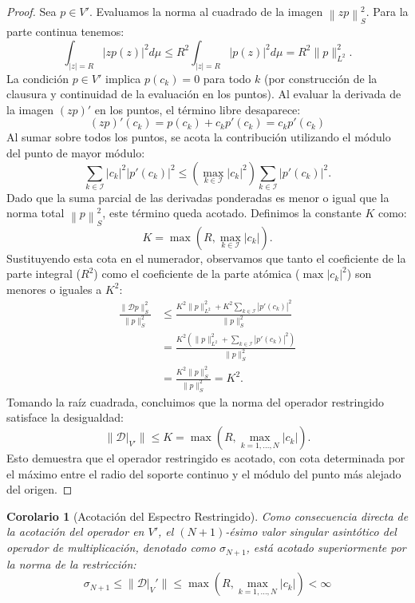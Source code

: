 \documentclass[12pt,a4paper]{article}
\newtheorem{corolario}{Corolario}
\theoremstyle{definition}
\theoremstyle{remark}
\newcommand{\norm}[1]{\left\| #1 \right\|_S}
\newcommand{\D}{\mathcal{D}}
\begin{document}
\begin{proof}
    Sea $p \in V'$. Evaluamos la norma al cuadrado de la imagen $\norm{zp}^2$. Para la parte continua tenemos:
    $$\int_{|z|=R} |z p(z)|^2 d\mu \le R^2 \int_{|z|=R} |p(z)|^2 d\mu = R^2 \|p\|_{L^2}^2.$$
    La condición $p \in V'$ implica $p(c_k)=0$ para todo $k$ (por construcción de la clausura y continuidad de la evaluación en los puntos). Al evaluar la derivada de la imagen $(zp)'$ en los puntos, el término libre desaparece:
    $$ (zp)'(c_k) = p(c_k) + c_k p'(c_k) = c_k p'(c_k) $$
    Al sumar sobre todos los puntos, se acota la contribución utilizando el módulo del punto de mayor módulo:
    $$ \sum_{k \in \mathcal{I}}  |c_k|^2 |p'(c_k)|^2 \le \left( \max_{k \in \mathcal{I}} |c_k|^2 \right) \sum_{k \in \mathcal{I}}  |p'(c_k)|^2. $$
    Dado que la suma parcial de las derivadas ponderadas es menor o igual que la norma total $\norm{p}^2$, este término queda acotado.
    Definimos la constante $K$ como:
    $$ K = \max \left( R, \max_{k \in \mathcal{I}} |c_k| \right). $$
    Sustituyendo esta cota en el numerador, observamos que tanto el coeficiente de la parte integral ($R^2$) como el coeficiente de la parte atómica ($\max |c_k|^2$) son menores o iguales a $K^2$:
    \begin{align*}
        \frac{\|\D p\|_S^2}{\|p\|_S^2} & \le \frac{K^2 \|p\|_{L^2}^2 + K^2 \sum_{k \in \mathcal{I}}  |p'(c_k)|^2}{\|p\|_{S}^2}          \\
                                       & = \frac{K^2 \left( \|p\|_{L^2}^2 + \sum_{k \in \mathcal{I}}  |p'(c_k)|^2 \right)}{\|p\|_{S}^2} \\
                                       & = \frac{K^2 \|p\|_S^2}{\|p\|_S^2} = K^2.
    \end{align*}
    Tomando la raíz cuadrada, concluimos que la norma del operador restringido satisface la desigualdad:
    $$\|\D|_{V'}\| \le K = \max \left( R, \max_{k=1,\dots,N} |c_k| \right).$$
    Esto demuestra que el operador restringido es acotado, con cota determinada por el máximo entre el radio del soporte continuo y el módulo del punto más alejado del origen.
\end{proof}

\begin{corolario}[Acotación del Espectro Restringido]
    Como consecuencia directa de la acotación del operador en $V'$, el $(N+1)$-ésimo valor singular asintótico del operador de multiplicación, denotado como $\sigma_{N+1}$, está acotado superiormente por la norma de la restricción:
    \begin{equation}
        \sigma_{N+1} \le \|\D|_V'\| \le \max \left( R, \max_{k=1,\dots,N} |c_k| \right) < \infty
    \end{equation}
\end{corolario}
\end{document}
